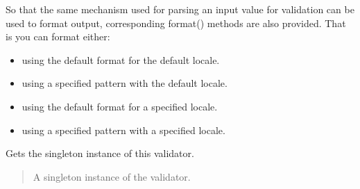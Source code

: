 \documentclass[letterpaper,10pt,english]{sphinxmanual}
\begin{document}
\begin{fulllineitems}
\sphinxAtStartPar
So that the same mechanism used for parsing an input value for validation can be used to format output,
corresponding format() methods are also provided. That is you can format either:
\begin{itemize}
\item {} 
\sphinxAtStartPar
using the default format for the default locale.

\item {} 
\sphinxAtStartPar
using a specified pattern with the default locale.

\item {} 
\sphinxAtStartPar
using the default format for a specified locale.

\item {} 
\sphinxAtStartPar
using a specified pattern with a specified locale.

\end{itemize}

\begin{fulllineitems}
\label{\detokenize{apache_commons_validator_python.routines:apache_commons_validator_python.routines.big_decimal_validator.BigDecimalValidator.get_instance}}
\pysigstartsignatures
{}
\pysigstopsignatures
\sphinxAtStartPar
Gets the singleton instance of this validator.
\begin{quote}\begin{description}
\sphinxAtStartPar
A singleton instance of the validator.

\end{description}\end{quote}

\end{fulllineitems}



\end{fulllineitems}
\end{document}
